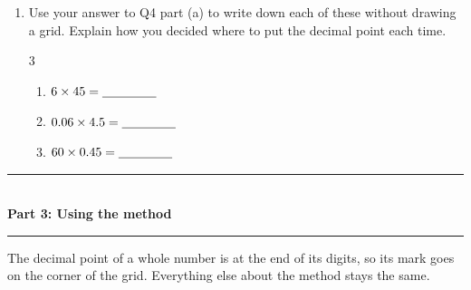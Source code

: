 \documentclass[12pt,a4paper]{article}
\newcommand{\ansline}[1][2.2cm]{\underline{\hspace{#1}}}
\newcommand{\heading}[1]{%
  \vspace{2pt}
  {\color{blue!45!black}\rule{\linewidth}{1pt}}\\[1pt]
  {\large\bfseries #1}\\[-6pt]
  {\color{blue!45!black}\rule{\linewidth}{0.4pt}}
  \vspace{2pt}}
\newcommand{\parttitle}[2]{\heading{Part #1: #2}}
\begin{document}
\begin{enumerate}[resume]
\item Use your answer to Q4 part (a) to write down each of these without
drawing a grid. Explain how you decided where to put the decimal point each
time.
\begin{multicols}{3}
\begin{enumerate}
  \item $6\times45=\ansline[1.5cm]$
  \item $0.06\times4.5=\ansline[1.5cm]$
  \item $60\times0.45=\ansline[1.5cm]$
\end{enumerate}
\end{multicols}
\vspace{13em}

\end{enumerate}

\newpage

\parttitle{3}{Using the method}

The decimal point of a whole number is at the end of its digits, so its mark
goes on the corner of the grid. Everything else about the method stays the
same.
\end{document}
